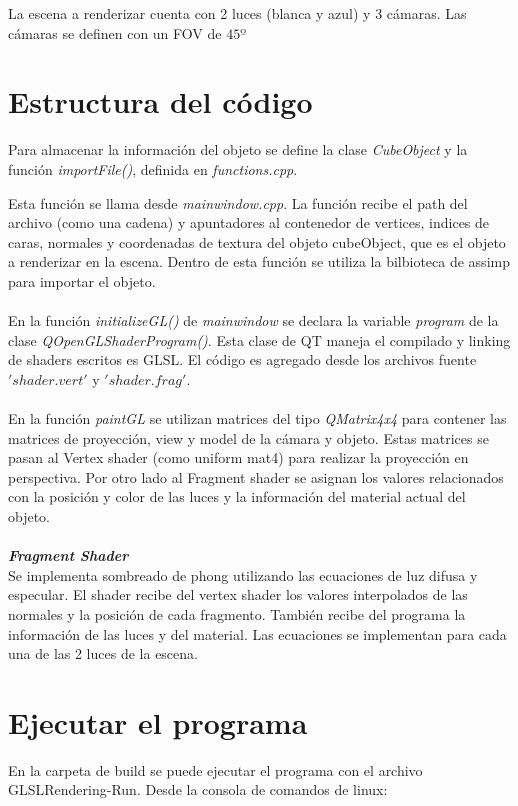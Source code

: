 \documentclass[12pt]{article}
\begin{document}
La escena a renderizar cuenta con 2 luces (blanca y azul) y 3 cámaras. Las cámaras se definen con un FOV de $45º$



\section{Estructura del código}

Para almacenar la información del objeto se define la clase \textit{CubeObject} y la  función \textit{importFile()}, definida en \textit{functions.cpp}.

Esta función se llama desde \textit{mainwindow.cpp}. La función recibe el path del archivo (como una cadena) y apuntadores al contenedor de vertices, indices de caras, normales y coordenadas de textura del objeto cubeObject, que es el objeto  a renderizar en la escena. Dentro de esta función se utiliza la bilbioteca de assimp para importar el objeto.
\\
\\
En la función \textit{initializeGL()} de \textit{mainwindow} se declara la variable \textit{program} de la clase \textit{QOpenGLShaderProgram()}. Esta clase de QT maneja el compilado y linking de shaders escritos es GLSL.
El código es agregado desde los archivos fuente $'shader.vert'$ y $'shader.frag'$.
\\
\\
En la función \textit{paintGL} se utilizan matrices del tipo \textit{QMatrix4x4} para contener las matrices de proyección, view y model de la cámara y objeto. Estas matrices se pasan al Vertex shader (como uniform mat4) para realizar la proyección en perspectiva.
Por otro lado al Fragment shader se asignan los valores relacionados con la posición y color de las luces y la información del material actual del objeto.
\\
\\
\textbf{\textit{Fragment Shader}}
\\
Se implementa sombreado de phong utilizando las ecuaciones de luz difusa y especular.
El shader recibe del vertex shader los valores interpolados de las normales y la posición de cada fragmento. También recibe del programa la información de las luces y del material. Las ecuaciones se implementan para cada una de las 2 luces de la escena.

\section{Ejecutar el programa}
En la carpeta de build se puede ejecutar el programa con el archivo GLSLRendering-Run. Desde la consola de comandos de linux:
\end{document}
